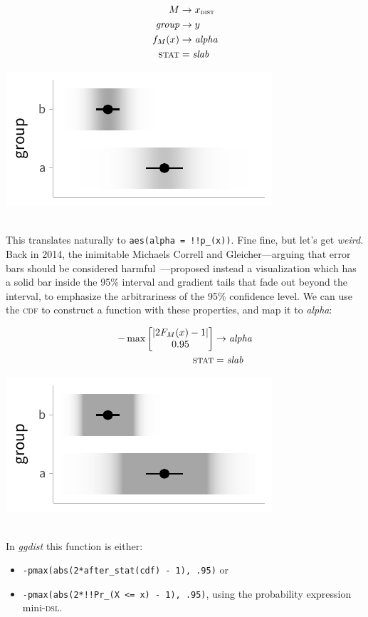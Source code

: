 \documentclass[journal]{vgtc}                     %
\newcommand{\equationfigure}[2]{%
\noindent
\begin{minipage}{.5\columnwidth}
\setlength{\abovedisplayskip}{0pt} %
\setlength{\belowdisplayskip}{0pt} %
#1\end{minipage}%
\begin{minipage}{.4\columnwidth}\centering #2 \end{minipage}%
\vspace{.5\belowdisplayskip}\\
}
\begin{document}
\equationfigure{
\begin{align*}
M &\rightarrow x_\textsc{dist}\\
\textit{group} &\rightarrow y\\
f_M(x) &\rightarrow \textit{alpha}\\
\textsc{stat} &= \mathit{slab}
\end{align*}
}{\includegraphics[width=1.2\columnwidth]{figs/3-slab_gradient_two_groups.pdf}}
This translates naturally to \texttt{aes(alpha = !!p\_(x))}. Fine fine, but let's get \textit{weird}. Back in 2014, the inimitable Michaels Correll and Gleicher---arguing that error bars should be considered harmful~\cite{correll2014error}---proposed instead a visualization which has a solid bar inside the 95\% interval and gradient tails that fade out beyond the interval, to emphasize the arbitrariness of the 95\% confidence level. We can use the \textsc{cdf} to construct a function with these properties, and map it to \textit{alpha}:

\equationfigure{
\begin{align*}
-\max \left[ \begin{matrix} \lvert 2 F_M(x) - 1 \rvert \\ 0.95 \end{matrix} \right] &\rightarrow \textit{alpha}\\
\textsc{stat} &= \mathit{slab}
\end{align*}
}{\includegraphics[width=1.2\columnwidth]{figs/3-slab_gradient_correll.pdf}}
In \textit{ggdist} this function is either:
\begin{itemize}
    \item \texttt{-pmax(abs(2*after\_stat(cdf) - 1), .95)} or
    \item    \texttt{-pmax(abs(2*!!Pr\_(X <= x) - 1), .95)}, using the probability expression mini-\textsc{dsl}.
\end{itemize}
\end{document}
